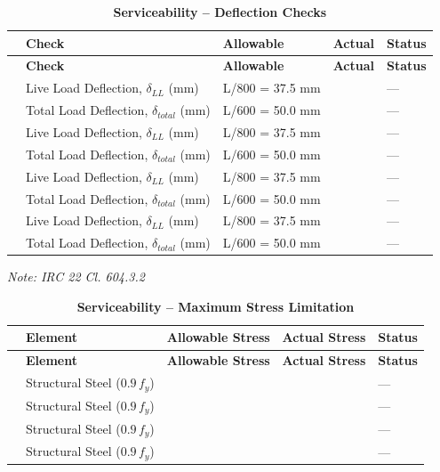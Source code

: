 \documentclass[12pt,a4paper]{report}
\numberwithin{table}{chapter}
\numberwithin{figure}{chapter}
\begin{document}
\vspace{1em}
\begin{longtable}{|C{2.5cm}|L{3.5cm}|C{3.5cm}|>{\centering\arraybackslash}p{3.5cm}|C{2.5cm}|}
\caption{\textbf{Serviceability -- Deflection Checks}}
\hline
{} \textbf{} & \textbf{Check} & \textbf{Allowable} & \textbf{Actual} & \textbf{Status} \\[6pt]
\hline
\endfirsthead
\hline
{} \textbf{} & \textbf{Check} & \textbf{Allowable} & \textbf{Actual} & \textbf{Status} \\[6pt]
\hline
\endhead
{} & Live Load Deflection, $\delta_{LL}$ (mm) & L/800 = 37.5 mm &  & --- \\[6pt]
 & Total Load Deflection, $\delta_{total}$ (mm) & L/600 = 50.0 mm &  & --- \\[6pt]
\hline
{} & Live Load Deflection, $\delta_{LL}$ (mm) & L/800 = 37.5 mm &  & --- \\[6pt]
 & Total Load Deflection, $\delta_{total}$ (mm) & L/600 = 50.0 mm &  & --- \\[6pt]
\hline
{} & Live Load Deflection, $\delta_{LL}$ (mm) & L/800 = 37.5 mm &  & --- \\[6pt]
 & Total Load Deflection, $\delta_{total}$ (mm) & L/600 = 50.0 mm &  & --- \\[6pt]
\hline
{} & Live Load Deflection, $\delta_{LL}$ (mm) & L/800 = 37.5 mm &  & --- \\[6pt]
 & Total Load Deflection, $\delta_{total}$ (mm) & L/600 = 50.0 mm &  & --- \\[6pt]
\hline
\end{longtable}
\noindent\textit{Note: IRC 22 Cl. 604.3.2}

\vspace{1em}
\begin{longtable}{|C{2.5cm}|L{3.5cm}|C{3.5cm}|>{\centering\arraybackslash}p{3.5cm}|C{2.5cm}|}
\caption{\textbf{Serviceability -- Maximum Stress Limitation}}
\hline
{} \textbf{} & \textbf{Element} & \textbf{Allowable Stress} & \textbf{Actual Stress} & \textbf{Status} \\[6pt]
\hline
\endfirsthead
\hline
{} \textbf{} & \textbf{Element} & \textbf{Allowable Stress} & \textbf{Actual Stress} & \textbf{Status} \\[6pt]
\hline
\endhead
\makecell{} & Structural Steel ($0.9\,f_y$) &  &  & --- \\[6pt]
\hline
\makecell{} & Structural Steel ($0.9\,f_y$) &  &  & --- \\[6pt]
\hline
\makecell{} & Structural Steel ($0.9\,f_y$) &  &  & --- \\[6pt]
\hline
\makecell{} & Structural Steel ($0.9\,f_y$) &  &  & --- \\[6pt]
\hline
\end{longtable}
\end{document}
